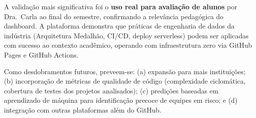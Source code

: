 \documentclass[
	12pt,
	openright,
	oneside,
	a4paper,
	brazil
]{abntex2}
\begin{document}
A validação mais significativa foi o \textbf{uso real para avaliação de alunos} por Dra.\ Carla ao final do semestre, confirmando a relevância pedagógica do dashboard. A plataforma demonstra que práticas de engenharia de dados da indústria (Arquitetura Medalhão, CI/CD, deploy serverless) podem ser aplicadas com sucesso ao contexto acadêmico, operando com infraestrutura zero via GitHub Pages e GitHub Actions.

Como desdobramentos futuros, preveem-se: (a) expansão para mais instituições; (b) incorporação de métricas de qualidade de código (complexidade ciclomática, cobertura de testes dos projetos analisados); (c) predições baseadas em aprendizado de máquina para identificação precoce de equipes em risco; e (d) integração com outras plataformas além do GitHub.


\end{document}
